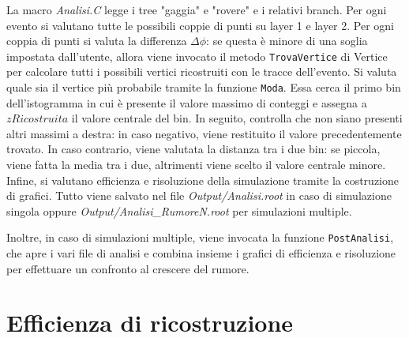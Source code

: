 \documentclass[11pt,a4paper]{article}
\begin{document}
La macro \textit{Analisi.C} legge i tree "gaggia" e "rovere" e i relativi branch. Per ogni evento si valutano tutte le possibili coppie di punti su layer 1 e layer 2. Per ogni coppia di punti si valuta la differenza $\Delta\phi$: se questa è minore di una soglia impostata dall'utente, allora viene invocato il metodo \lstinline{TrovaVertice} di Vertice per calcolare tutti i possibili vertici ricostruiti con le tracce dell'evento.
Si valuta quale sia il vertice più probabile tramite la funzione \lstinline{Moda}. Essa cerca il primo bin dell'istogramma in cui è presente il valore massimo di conteggi e assegna a $zRicostruita$ il valore centrale del bin. In seguito, controlla che non siano presenti altri massimi a destra: in caso negativo, viene restituito il valore precedentemente trovato. In caso contrario, viene valutata la distanza tra i due bin: se piccola, viene fatta la media tra i due, altrimenti viene scelto il valore centrale minore.\\
Infine, si valutano efficienza e risoluzione della simulazione tramite la costruzione di grafici. Tutto viene salvato nel file \textit{Output/Analisi.root} in caso di simulazione singola oppure \textit{Output/Analisi\_RumoreN.root} per simulazioni multiple.

Inoltre, in caso di simulazioni multiple, viene invocata la funzione \lstinline{PostAnalisi}, che apre i vari file di analisi e combina insieme i grafici di efficienza e risoluzione per effettuare un confronto al crescere del rumore.

\section{Efficienza di ricostruzione}
\end{document}
